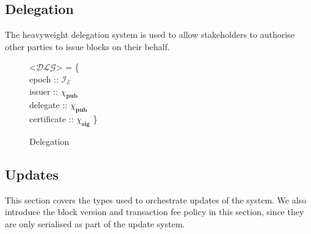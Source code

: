 \documentclass{article}
\def\fld{\\\llap{,\quad}}%
\newcommand{\idsof}[1]{\mathcal{I}\!_#1}
\newcommand{\epochids}{\idsof{\mathcal{E}}}
\newcommand{\pubkey}{\chi_{\textbf{pub}}}
\newcommand{\signature}{\chi_{\textbf{sig}}}
\newcommand{\dlg}{\mathcal{DLG}}
\begin{document}
\subsection{Delegation}

The heavyweight delegation system is used to allow stakeholders to authorise
other parties to issue blocks on their behalf.

\begin{figure}[H]
  \begin{grammar}
    <$\dlg$> = \{
    \fld epoch :: $\epochids$
    \fld issuer :: $\pubkey$
    \fld delegate :: $\pubkey$
    \fld certificate :: $\signature$
    \}
  \end{grammar}
  \caption{Delegation}
  \label{fig:dlgtypes}
\end{figure}

\subsection{Updates}

This section covers the types used to orchestrate updates of the system. We also
introduce the block version and transaction fee policy in this section, since
they are only serialised as part of the update system.
\end{document}
